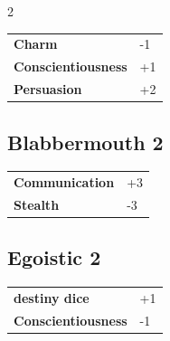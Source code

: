 \begin{multicols}{2}
\begin{tcolorbox}
\begin{tabular}{@{}ll@{}}
    \textbf{Charm} & -1\\
    \textbf{Conscientiousness} & +1\\
    \textbf{Persuasion} & +2\\
\end{tabular}


\end{tcolorbox}

\begin{tcolorbox}
    \subsection*{Blabbermouth \hfill \small{2 }}
    \tcblower




\begin{tabular}{@{}ll@{}}
    \textbf{Communication} & +3\\
    \textbf{Stealth} & -3\\
\end{tabular}


\end{tcolorbox}

\begin{tcolorbox}
    \subsection*{Egoistic \hfill \small{2 }}
    \tcblower




\begin{tabular}{@{}ll@{}}
    \textbf{destiny dice} & +1\\
    \textbf{Conscientiousness} & -1\\
\end{tabular}


\end{tcolorbox}


\end{multicols}
